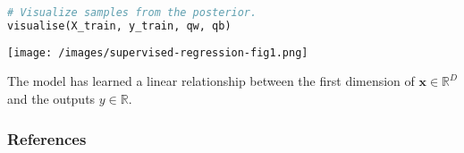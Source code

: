 \begin{lstlisting}[language=Python]
# Visualize samples from the posterior.
visualise(X_train, y_train, qw, qb)
\end{lstlisting}

\texttt{[image: /images/supervised-regression-fig1.png]}

The model has learned a linear relationship between the
first dimension of $\mathbf{x}\in\mathbb{R}^D$ and the outputs
$y\in\mathbb{R}$.

\subsubsection{References}\label{references}
